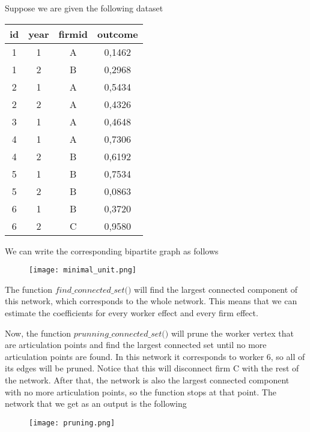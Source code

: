 \documentclass[12pt]{article}
\begin{document}
Suppose we are given the following dataset

\begin{table}[h!]
    \centering
\begin{tabular}{|c c c c|} 
 \hline
 id & year & firmid & outcome \\ [0.5ex] 
 \hline\hline
 1 & 1 & A &  0,1462\\ 
 \hline
 1 & 2 & B & 0,2968 \\
 \hline
 2 & 1 & A &  0,5434\\
 \hline
 2 & 2 & A & 0,4326 \\
 \hline
 3 & 1 & A & 0,4648 \\
 \hline
 4 & 1 & A & 0,7306 \\
 \hline
 4 & 2 & B & 0,6192 \\
 \hline
 5 & 1 & B &  0,7534\\
 \hline
 5 & 2 & B &  0,0863\\
 \hline
6 & 1 & B &  0,3720\\
 \hline
 6 & 2 & C & 0,9580 \\ [1ex] 
 \hline
\end{tabular}
\end{table}

We can write the corresponding bipartite graph as follows
\begin{figure}[h!]
    \centering
\texttt{[image: minimal\_unit.png]}    \end{figure}

The function $\textit{find\_connected\_set()}$ will find the largest connected component of this network, which corresponds to the whole network. This means that we can estimate the coefficients for every worker effect and every firm effect. 

Now, the function $\textit{prunning\_connected\_set()}$ will prune the worker vertex that are articulation points and find the largest connected set until no more articulation points are found. In this network it corresponds to worker 6, so all of its edges will be pruned. Notice that this will disconnect firm C with the rest of the network. After that, the network is also the largest connected component with no more articulation points, so the function stops at that point. The network that we get as an output is the following

\begin{figure}[h!]
    \centering
\texttt{[image: pruning.png]}    
\end{figure}
\end{document}
